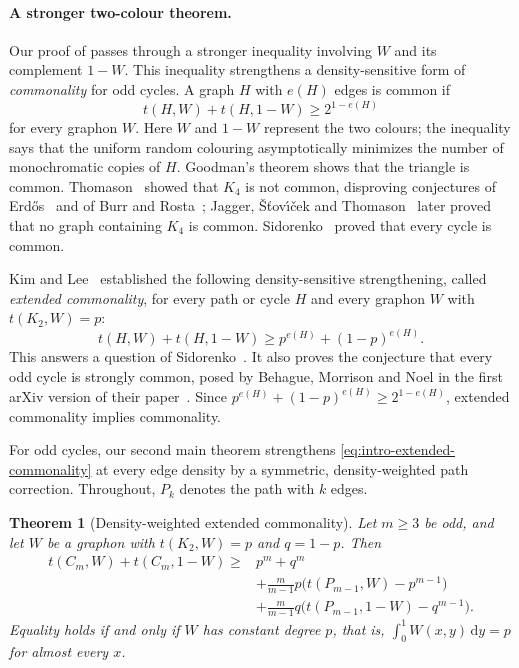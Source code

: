\documentclass[11pt]{article}
\newtheorem{theorem}{Theorem}[section]
\numberwithin{equation}{section}
\newcommand{\dd}{\,\mathrm d}
\newcommand{\dens}[2]{t(#1,#2)}
\newcommand{\tC}[2]{t(C_{#1},#2)}
\newcommand{\tP}[2]{t(P_{#1},#2)}
\newcommand{\edens}[1]{t(K_{2},#1)}
\begin{document}
\paragraph{A stronger two-colour theorem.}
Our proof of  passes through a stronger inequality involving $W$ and its complement $1-W$.
This inequality strengthens a density-sensitive form of \emph{commonality} for odd cycles.
A graph $H$ with $e(H)$ edges is common if
\[
  \dens HW+\dens H{1-W}\ge2^{1-e(H)}
\]
for every graphon $W$.
Here $W$ and $1-W$ represent the two colours; the inequality says that the uniform random colouring asymptotically minimizes the number of monochromatic copies of $H$.
Goodman's theorem shows that the triangle is common.
Thomason~\cite{thomason1989disproof} showed that $K_4$ is not common, disproving conjectures of Erd\H os~\cite{erdos1962number} and of Burr and Rosta~\cite{burr1980ramsey}; Jagger, \v{S}\v{t}ov\'{\i}\v{c}ek and Thomason~\cite{jagger1996multiplicities} later proved that no graph containing $K_4$ is common.
Sidorenko~\cite{sidorenko1989cycles} proved that every cycle is common.

Kim and Lee~\cite{kim2024extended} established the following density-sensitive strengthening, called \emph{extended commonality}, for every path or cycle $H$ and every graphon $W$ with $\edens W=p$:
\begin{equation}\label{eq:intro-extended-commonality}
  \dens HW+\dens H{1-W}\ge p^{e(H)}+(1-p)^{e(H)}.
\end{equation}
This answers a question of Sidorenko~\cite{sidorenko1989cycles}.
It also proves the conjecture that every odd cycle is strongly common, posed by Behague, Morrison and Noel in the first arXiv version of their paper~\cite[Conjecture~9.7]{behague2022commonv1}.
Since $p^{e(H)}+(1-p)^{e(H)}\ge2^{1-e(H)}$, extended commonality implies commonality.

For odd cycles, our second main theorem strengthens
\eqref{eq:intro-extended-commonality} at every edge density by a
symmetric, density-weighted path correction. Throughout, $P_k$ denotes
the path with $k$ edges.

\begin{theorem}[Density-weighted extended commonality]
\label{thm:weighted-commonality}
  Let $m\ge3$ be odd, and let $W$ be a graphon with
  $\edens W=p$ and $q=1-p$. Then
  \begin{equation}\label{eq:intro-weighted-commonality}
    \begin{aligned}
      \tC mW+\tC m{1-W}\ge{}&p^m+q^m\\
      &+\frac{m}{m-1}p\bigl(\tP{m-1}W-p^{m-1}\bigr)\\
      &+\frac{m}{m-1}q\bigl(\tP{m-1}{1-W}-q^{m-1}\bigr).
    \end{aligned}
  \end{equation}
  Equality holds if and only if $W$ has constant degree $p$, that is,
  $\int_0^1W(x,y)\dd y=p$ for almost every $x$.
\end{theorem}
\end{document}
